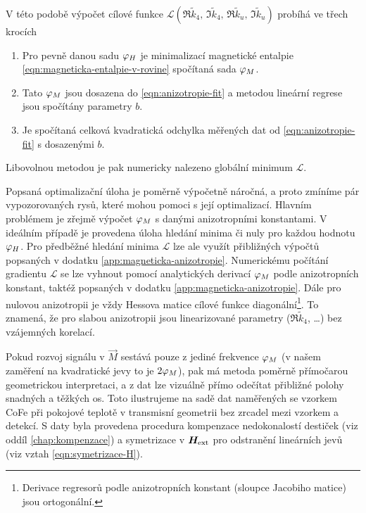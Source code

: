 V této podobě výpočet cílové funkce $\mathcal{L}(\Re\tilde{k}_4,\,\Im\tilde{k}_4,\,\Re\tilde{k}_u,\,\Im\tilde{k}_u)$ probíhá ve třech krocích
\begin{enumerate}
    \item Pro pevně danou sadu $\varphi_H$ je minimalizací magnetické entalpie \eqref{eqn:magneticka-entalpie-v-rovine} spočítaná sada $\varphi_M$.
    \item Tato $\varphi_M$ jsou dosazena do \eqref{eqn:anizotropie-fit} a metodou lineární regrese jsou spočítány parametry $b$.
    \item Je spočítaná celková kvadratická odchylka měřených dat od \eqref{eqn:anizotropie-fit} s dosazenými $b$.
\end{enumerate}
Libovolnou metodou je pak numericky nalezeno globální minimum $\mathcal{L}$.

Popsaná optimalizační úloha je poměrně výpočetně náročná, a proto zmíníme pár vypozorovaných rysů, které mohou pomoci s její optimalizací.
Hlavním problémem je zřejmě výpočet $\varphi_M$ s danými anizotropními konstantami.
V ideálním případě je provedena úloha hledání minima či nuly pro každou hodnotu $\varphi_H$.
Pro předběžné hledání minima $\mathcal{L}$ lze ale využít přibližných výpočtů popsaných v dodatku \ref{app:magneticka-anizotropie}.
Numerickému počítání gradientu $\mathcal{L}$ se lze vyhnout pomocí analytických derivací $\varphi_M$ podle anizotropních konstant, taktéž popsaných v dodatku \ref{app:magneticka-anizotropie}.
Dále pro nulovou anizotropii je vždy Hessova matice cílové funkce diagonální\footnote{Derivace regresorů podle anizotropních konstant (sloupce Jacobiho matice) jsou ortogonální.}.
To znamená, že pro slabou anizotropii jsou linearizované parametry ($\Re \tilde{k}_4$, \ldots) bez vzájemných korelací.

Pokud rozvoj signálu v $\vec{M}$ sestává pouze z jediné frekvence $\varphi_M$ (v našem zaměření na kvadratické jevy to je $2\varphi_M$), pak má metoda poměrně přímočarou geometrickou interpretaci, a z dat lze vizuálně přímo odečítat přibližné polohy snadných a těžkých os.
Toto ilustrujeme na sadě dat naměřených se vzorkem CoFe při pokojové teplotě v transmisní geometrii bez zrcadel mezi vzorkem a detekcí.
S daty byla provedena procedura kompenzace nedokonalostí destiček (viz oddíl \ref{chap:kompenzace}) a symetrizace v $\bm{H}_\textrm{ext}$ pro odstranění lineárních jevů (viz vztah \eqref{eqn:symetrizace-H}).

